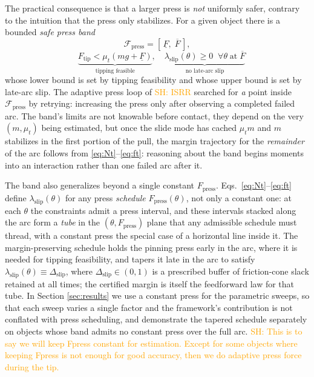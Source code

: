 \documentclass[10pt, conference]{IEEEtran}
\newcommand{\sh}[1]{\textcolor{orange}{SH: #1}}
\begin{document}
The practical consequence is that a larger press is \emph{not} uniformly safer, contrary to the intuition that the press only stabilizes. For a given object there is a bounded \emph{safe press band}
\begin{equation*}
    \mathcal{F}_{\mathrm{press}} = \left[\, \underline{F},\; \overline{F} \,\right],
\end{equation*}
\begin{equation}
    \quad \underbrace{F_{\mathrm{tip}} < \mu_t (mg + \underline{F})}_{\text{tipping feasible}}, \quad \underbrace{\lambda_{\mathrm{slip}}(\theta) \geq 0 \;\; \forall \theta \;\text{at}\; \overline{F}}_{\text{no late-arc slip}}
\end{equation}
whose lower bound is set by tipping feasibility and whose upper bound is set by late-arc slip. The adaptive press loop of \sh{ISRR} searched for \emph{a} point inside $\mathcal{F}_{\mathrm{press}}$ by retrying: increasing the press only after observing a completed failed arc. The band's limits are not knowable before contact, they depend on the very $(m, \mu_t)$ being estimated, but once the slide mode has cached $\mu_t m$ and $m$ stabilizes in the first portion of the pull, the margin trajectory for the \emph{remainder} of the arc follows from \eqref{eq:Nt}--\eqref{eq:ft}: reasoning about the band begins moments into an interaction rather than one failed arc after it.

The band also generalizes beyond a single constant $F_{\mathrm{press}}$. Eqs.~\eqref{eq:Nt}--\eqref{eq:ft} define $\lambda_{\mathrm{slip}}(\theta)$ for any press \emph{schedule} $F_{\mathrm{press}}(\theta)$, not only a constant one: at each $\theta$ the constraints admit a press interval, and these intervals stacked along the arc form a \emph{tube} in the $(\theta, F_{\mathrm{press}})$ plane that any admissible schedule must thread, with a constant press the special case of a horizontal line inside it. The margin-preserving schedule holds the pinning press early in the arc, where it is needed for tipping feasibility, and tapers it late in the arc to satisfy $\lambda_{\mathrm{slip}}(\theta) \equiv \Delta_{\mathrm{slip}}$, where $\Delta_{\mathrm{slip}} \in (0,1)$ is a prescribed buffer of friction-cone slack retained at all times; the certified margin is itself the feedforward law for that tube. In Section \ref{sec:results} we use a constant press for the parametric sweeps, so that each sweep varies a single factor and the framework's contribution is not conflated with press scheduling, and demonstrate the tapered schedule separately on objects whose band admits no constant press over the full arc. \sh{This is to say we will keep Fpress constant for estimation. Except for some objects where keeping Fpress is not enough for good accuracy, then we do adaptive press force during the tip.}
\end{document}
